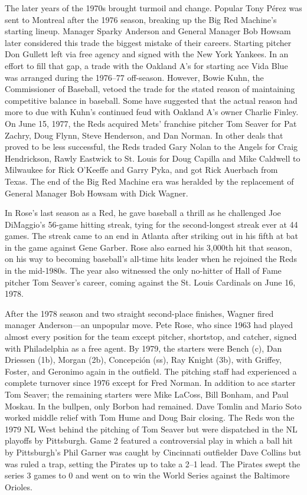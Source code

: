 The later years of the 1970s brought turmoil and change. Popular Tony
Pérez was sent to Montreal after the 1976 season, breaking up the Big
Red Machine's starting lineup. Manager Sparky Anderson and General
Manager Bob Howsam later considered this trade the biggest mistake of
their careers. Starting pitcher Don Gullett left via free agency and
signed with the New York Yankees. In an effort to fill that gap, a trade
with the Oakland A's for starting ace Vida Blue was arranged during the
1976--77 off-season. However, Bowie Kuhn, the Commissioner of Baseball,
vetoed the trade for the stated reason of maintaining competitive
balance in baseball. Some have suggested that the actual reason had more
to due with Kuhn's continued feud with Oakland A's owner Charlie Finley.
On June 15, 1977, the Reds acquired Mets' franchise pitcher Tom Seaver
for Pat Zachry, Doug Flynn, Steve Henderson, and Dan Norman. In other
deals that proved to be less successful, the Reds traded Gary Nolan to
the Angels for Craig Hendrickson, Rawly Eastwick to St. Louis for Doug
Capilla and Mike Caldwell to Milwaukee for Rick O'Keeffe and Garry Pyka,
and got Rick Auerbach from Texas. The end of the Big Red Machine era was
heralded by the replacement of General Manager Bob Howsam with Dick
Wagner.

In Rose's last season as a Red, he gave baseball a thrill as he
challenged Joe DiMaggio's 56-game hitting streak, tying for the
second-longest streak ever at 44 games. The streak came to an end in
Atlanta after striking out in his fifth at bat in the game against Gene
Garber. Rose also earned his 3,000th hit that season, on his way to
becoming baseball's all-time hits leader when he rejoined the Reds in
the mid-1980s. The year also witnessed the only no-hitter of Hall of
Fame pitcher Tom Seaver's career, coming against the St. Louis Cardinals
on June 16, 1978.

After the 1978 season and two straight second-place finishes, Wagner
fired manager Anderson---an unpopular move. Pete Rose, who since 1963
had played almost every position for the team except pitcher, shortstop,
and catcher, signed with Philadelphia as a free agent. By 1979, the
starters were Bench (c), Dan Driessen (1b), Morgan (2b), Concepción
(ss), Ray Knight (3b), with Griffey, Foster, and Geronimo again in the
outfield. The pitching staff had experienced a complete turnover since
1976 except for Fred Norman. In addition to ace starter Tom Seaver; the
remaining starters were Mike LaCoss, Bill Bonham, and Paul Moskau. In
the bullpen, only Borbon had remained. Dave Tomlin and Mario Soto worked
middle relief with Tom Hume and Doug Bair closing. The Reds won the 1979
NL West behind the pitching of Tom Seaver but were dispatched in the NL
playoffs by Pittsburgh. Game 2 featured a controversial play in which a
ball hit by Pittsburgh's Phil Garner was caught by Cincinnati outfielder
Dave Collins but was ruled a trap, setting the Pirates up to take a 2--1
lead. The Pirates swept the series 3 games to 0 and went on to win the
World Series against the Baltimore Orioles.

